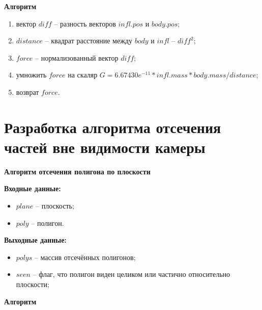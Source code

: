 \textbf{Алгоритм}

\begin{enumerate}
	\item вектор $diff$ -- разность векторов $infl.pos$ и $body.pos$;
	\item $distance$ -- квадрат расстояние между $body$ и $infl$ -- $diff^2$;
	\item $force$ -- нормализованный вектор $diff$;
	\item умножить $force$ на скаляр $G=6.67430e^{-11} * infl.mass * body.mass / distance$;
	\item возврат $force$.
\end{enumerate}

\section{Разработка алгоритма отсечения частей вне видимости камеры}

\textbf{Алгоритм отсечения полигона по плоскости}

\textbf{Входные данные:}
\begin{itemize}
	\item $plane$ -- плоскость;
	\item $poly$ -- полигон.
\end{itemize}

\textbf{Выходные данные:}
\begin{itemize}
	\item $polys$ -- массив отсечённых полигонов;
	\item $seen$ -- флаг, что полигон виден целиком или частично относительно плоскости;
\end{itemize}

\textbf{Алгоритм}

